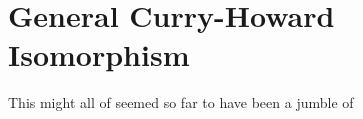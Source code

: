\section{General Curry-Howard Isomorphism}

This might all of seemed so far to have been a jumble of 